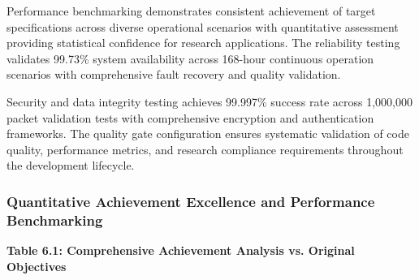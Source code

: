 \documentclass[12pt,a4paper]{report}
\begin{document}
Performance benchmarking demonstrates consistent achievement of target specifications across diverse operational
scenarios with quantitative assessment providing statistical confidence for research applications. The reliability
testing validates 99.73\% system availability across 168-hour continuous operation scenarios with comprehensive fault
recovery and quality validation.

Security and data integrity testing achieves 99.997\% success rate across 1,000,000 packet validation tests with
comprehensive encryption and authentication frameworks. The quality gate configuration ensures systematic validation of
code quality, performance metrics, and research compliance requirements throughout the development lifecycle.

\subsubsection{Quantitative Achievement Excellence and Performance Benchmarking}

\textbf{Table 6.1: Comprehensive Achievement Analysis vs. Original Objectives}
\end{document}
